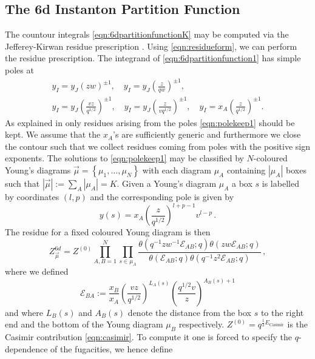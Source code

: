 \documentclass[main.tex]{subfiles}
\begin{document}
\subsection{The 6d Instanton Partition Function}
The countour integrals \eqref{eqn:6dpartitionfunctionK} may be computed via the Jefferey-Kirwan residue prescription \cite{1993alg.geom..7001J,Benini:2013nda,Benini:2013xpa}. Using \eqref{eqn:residueform}, we can perform the residue prescription. The integrand of \eqref{eqn:6dpartitionfunction1} has simple poles at
\begin{gather}
y_I=y_J\left(zw\right)^{\pm1},\quad y_I=y_J\left(\frac{z}{qw}\right)^{\pm1},\\
y_I=y_J\left(\frac{vz}{q^{1/2}}\right)^{\pm1},\quad y_I=y_J\left(\frac{z}{vq^{1/2}}\right)^{\pm1},\quad y_I=x_A\left(\frac{z}{q^{1/2}}\right)^{\pm1}.\label{eqn:polekeep1}
\end{gather}
As explained in \cite{Kim:2011mv,Kim:2012gu} only residues arising from the poles \eqref{eqn:polekeep1} should be kept. We assume that the $x_A$'s are sufficiently generic and furthermore we close the contour such that we collect residues coming from poles with the positive sign exponents. 
The solutions to \eqref{eqn:polekeep1} may be classified by $N$-coloured Young's diagrams $\vec{\mu}=\left\{\mu_1,\dots,\mu_N\right\}$ with each diagram $\mu_A$ containing $|\mu_A|$ boxes such that $|\vec{\mu}|:=\sum_{A}|\mu_A|=K$. Given a Young's diagram $\mu_A$ a box $s$ is labelled by coordinates $(l,p)$ and the corresponding pole is given by
\begin{equation}
y(s)=x_A\left(\frac{z}{q^{1/2}}\right)^{l+p-1}v^{l-p} \, .
\end{equation}
The residue for a fixed coloured Young diagram is then
\begin{equation}
Z^{6d}_{\vec{\mu}}=Z^{(0)}\prod_{A,B=1}^N\prod_{s\in \mu_A}\frac{\theta\left(q^{-1}zw^{-1}\mathcal{E}_{AB};q\right)\theta\left(zw\mathcal{E}_{AB};q\right)}{\theta\left(\mathcal{E}_{AB};q\right)\theta\left(q^{-1}z^2\mathcal{E}_{AB};q\right)}
\, ,
\end{equation}
where we defined
\begin{equation}
\mathcal{E}_{BA}:=\frac{x_B}{x_A}\left(\frac{vz}{q^{1/2}}\right)^{L_A(s)}\left(\frac{q^{1/2}v}{z}\right)^{A_B(s)+1}
\end{equation}
and where $L_B(s)$ and $A_B(s)$ denote the distance from the box $s$ to the right end and the bottom of the Young diagram $\mu_B$ respectively. $Z^{(0)}=q^{\frac{1}{2}E_{\text{Casimir}}}$ is the Casimir contribution \eqref{eqn:casimir}. To compute it one is forced to specify the $q$-dependence of the fugacities, we hence define  
\end{document}
